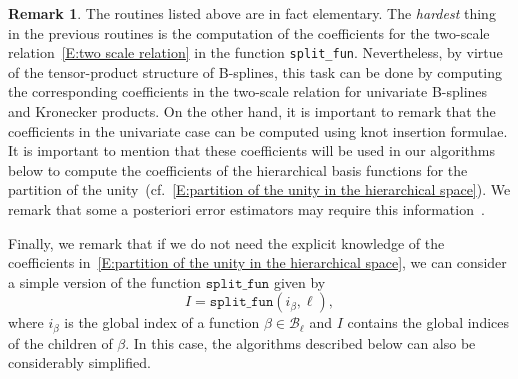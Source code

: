 \documentclass[12pt,a4paper,pdftex]{article}
\theoremstyle{plain}
\theoremstyle{definition}
\newtheorem{remark}[theorem]{Remark}
\theoremstyle{remark}
\newcommand\BB{\mathcal B}
\begin{document}
\begin{remark}\label{R:two-scale relation}
The routines listed above are in fact elementary. The \emph{hardest} thing in the previous routines is the computation of the coefficients for the two-scale relation~\eqref{E:two scale relation} in the function \texttt{split\_fun}. Nevertheless, by virtue of the tensor-product structure of B-splines, this task can be done by computing the corresponding coefficients in the two-scale relation for univariate B-splines and Kronecker products. On the other hand, it is important to remark that the coefficients in the univariate case can be computed using knot insertion formulae. 
It is important to mention that these coefficients will be used in our algorithms below to compute the coefficients of the hierarchical basis functions for the partition of the unity~(cf.~\eqref{E:partition of the unity in the hierarchical space}). We remark that some a posteriori error estimators may require this information~\cite{BuGa15}.

Finally, we remark that if we do not need the explicit knowledge of the coefficients in~\eqref{E:partition of the unity in the hierarchical space}, we can consider a simple version of the function $\texttt{split\_fun}$ given by 
 $$I = \texttt{split\_fun} (i_\beta,\ell),$$ where $i_\beta$ is the global 
index of a function $\beta\in\BB_\ell$ and $I$ contains the global indices of 
the children of $\beta$. In this case, the algorithms described below can also be considerably simplified. 
\end{remark}
\end{document}

